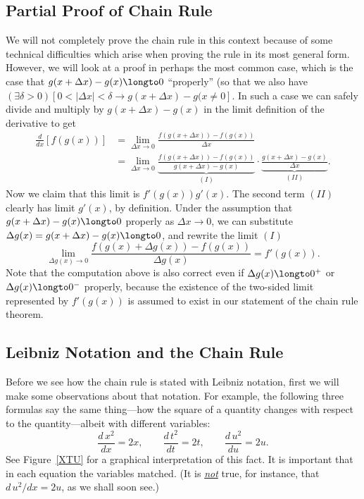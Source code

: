 \subsection{Partial Proof of Chain Rule}
We will not completely
prove the chain rule in this context because of some technical
difficulties which arise when
proving the rule in its most general form.  However, we will look
at a proof in perhaps the most common case, which is
the case that $g(x+\Delta x)-g(x)\longto 0$ ``properly'' 
(so that we also have %
$(\exists\delta>0)[0<|\Delta x|<\delta\longrightarrow
g(x+\Delta x)-g(x\ne0]$.
In such a case we can safely divide and multiply by $g(x+\Delta x)-g(x)$
in the limit definition of the derivative to get
\begin{align*}
\frac{d}{dx}[f(g(x))]&=
   \lim_{\Delta x\to 0}\frac{f(g(x+\Delta x))-f(g(x))}{\Delta x}\\
  &=\lim_{\Delta x\to 0}
      \underbrace{\frac{f(g(x+\Delta x))-f(g(x))}{g(x+\Delta x)-g(x)}}_{(I)}
        \cdot
       \underbrace{\frac{g(x+\Delta x)-g(x)}{\Delta x}}_{(II)}.\end{align*}
Now we claim that this limit is $f'(g(x))g'(x)$.  The second
term $(II)$ clearly has limit $g'(x)$, by definition.
Under the assumption that $g(x+\Delta x)-g(x)\longto0$ properly
as $\Delta x\to0$, we can substitute 
$\Delta g(x)=g(x+\Delta x)-g(x)\longto0$,
and rewrite the limit $(I)$\footnotemark  %
$$\lim_{\Delta g(x)\to0}\frac{f(g(x)+\Delta g(x))-f(g(x))}{\Delta g(x)}
  =f'(g(x)).$$
%      
Note that the computation above is also correct even if 
$\Delta g(x)\longto 0^+$ or $\Delta g(x)\longto 0^-$ properly, 
because the
existence of the two-sided limit represented by $f'(g(x))$
is assumed to exist in our statement of the chain rule theorem.





\subsection{Leibniz Notation and the Chain Rule}
Before we see how the chain rule is stated with Leibniz
notation, first we will make some observations
about that notation.  For example, the following
three formulas say the same thing---how the square of 
a quantity changes with respect
to the quantity---albeit with different
variables:
$$\frac{d\,x^2}{dx}=2x, \qquad \frac{d\,t^2}{dt}=2t,\qquad
\frac{d\,u^2}{du}=2u.$$
See Figure~\ref{XTU} for a graphical interpretation of this fact.
It is important that in each equation the variables matched.
(It is \underline{\it not} true,
for instance, that $d\,u^2/dx=2u$, as we shall soon see.)

